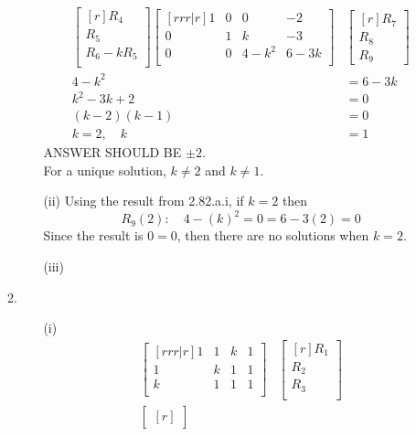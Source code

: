 \documentclass{report}
\theoremstyle{plain}
\theoremstyle{definition}
\theoremstyle{plain}
\begin{document}
\begin{enumerate}
\begin{enumerate}
\begin{enumerate}
\begin{align*}
		\begin{bmatrix}[r]	
		R_4\\
		R_5\\
		R_6 - kR_5\\	
		\end{bmatrix}
		\begin{bmatrix}[rrr|r]
		1 & 0 & 0 & -2\\
		0 & 1 & k & -3\\
		0 & 0 & 4-k^2 & 6-3k\\
		\end{bmatrix}&
		\begin{bmatrix}[r]
		R_7\\ R_8\\ R_9
		\end{bmatrix}\\		
		4-k^2&= 6-3k\\
		k^2-3k+2&=0\\
		(k-2)(k-1)&=0\\
		k=2, \quad k&=1
		\end{align*}
		ANSWER SHOULD BE $\pm 2$.\\
		For a unique solution, $k \neq 2$ and $k \neq 1$.\\
		\item [(ii)] Using the result from 2.82.a.i, if $k=2$ then
		\[ R_9(2): \quad 4-(k)^2 = 0 = 6-3(2) = 0 \]
		Since the result is $0 = 0$, then there are no solutions when $k=2$.\\
		\item [(iii)] 
		\end{enumerate}	
		\medskip
	\item
	\medskip
		\begin{enumerate}
		\item [(i)]
		\begin{align*}
		\begin{bmatrix}[rrr|r]
		1 & 1 & k & 1\\
		1 & k & 1 & 1\\
		k & 1 & 1 & 1\\
		\end{bmatrix}&
		\begin{bmatrix}[r]
		R_1\\ R_2\\ R_3\\
		\end{bmatrix}\\
		\begin{bmatrix}[r]

\end{bmatrix}
\end{align*}
\end{enumerate}
\end{enumerate}
\end{enumerate}
\end{document}
